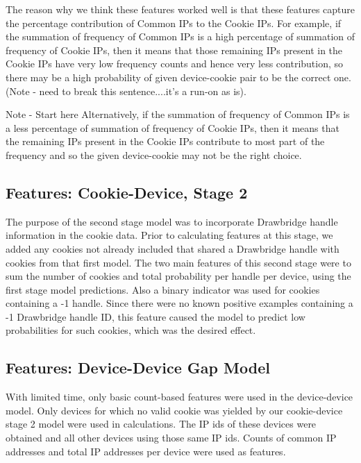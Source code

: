 \documentclass[9pt, journal]{IEEEtran}
\begin{document}
The reason why we think these features worked well is that these features capture the percentage contribution of Common IPs to the Cookie IPs. 
For example, if the summation of frequency of Common IPs is a high percentage of summation of frequency of Cookie IPs, then it means that those remaining IPs present in the Cookie IPs have very low frequency counts and hence very less contribution, so there may be a high probability of given device-cookie pair to be the correct one. (Note - need to break this sentence....it's a run-on as is).

Note - Start here
Alternatively, if the summation of frequency of Common IPs is a less percentage of summation of frequency of Cookie IPs, then it means that the remaining IPs present in the Cookie IPs contribute to most part of the frequency and so the given device-cookie may not be the right choice.

\subsection{Features: Cookie-Device, Stage 2}
The purpose of the second stage model was to incorporate Drawbridge handle information in the cookie data. 
Prior to calculating features at this stage, we added any cookies not already included that shared a Drawbridge handle with cookies from that first model.
The two main features of this second stage were to sum the number of cookies and total probability per handle per device, using the first stage model predictions.
Also a binary indicator was used for cookies containing a -1 handle. 
Since there were no known positive examples containing a -1 Drawbridge handle ID, this feature caused the model to predict low probabilities for such cookies, which was the desired effect.


\subsection{Features: Device-Device Gap Model}
With limited time, only basic count-based features were used in the device-device model.
Only devices for which no valid cookie was yielded by our cookie-device stage 2 model were used in calculations. 
The IP ids of these devices were obtained and all other devices using those same IP ids. 
Counts of common IP addresses and total IP addresses per device were used as features.
\end{document}
